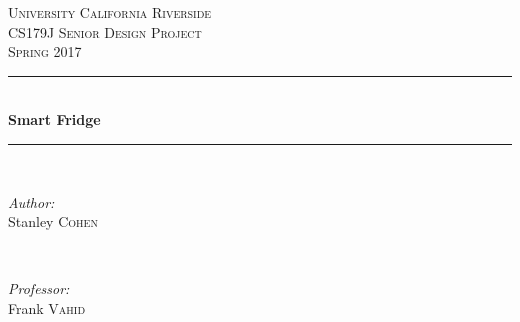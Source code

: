 \begin{titlepage}

\newcommand{\HRule}{\rule{\linewidth}{0.5mm}} %

\center %
 

\textsc{\LARGE University California Riverside}\\[1.5cm] %
\textsc{\Large CS179J Senior Design Project}\\[0.5cm] %
\textsc{\large Spring 2017}\\[0.5cm] %


\HRule \\[0.4cm]
{ \huge \bfseries Smart Fridge}\\[0.4cm] %
\HRule \\[1.5cm]
 

\begin{minipage}{0.4\textwidth}
\begin{flushleft} \large
\emph{Author:}\\
Stanley \textsc{Cohen} %
\end{flushleft}
\end{minipage}
~
\begin{minipage}{0.4\textwidth}
\begin{flushright} \large
\emph{Professor:} \\
Frank \textsc{Vahid} %
\end{flushright}
\end{minipage}\\[2cm]



\end{titlepage}
